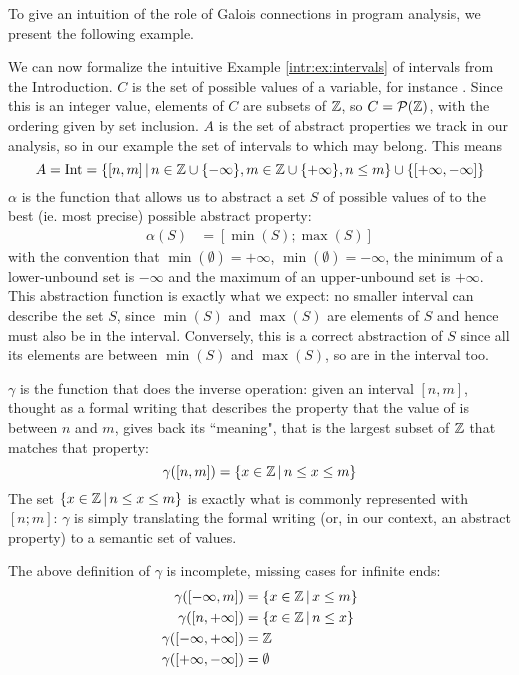 To give an intuition of the role of Galois connections in program analysis, we present the following example.
\begin{example}[Intervals]\label{ch2:ex:intervals}
	We can now formalize the intuitive Example \ref{intr:ex:intervals} of intervals from the Introduction.
	$C$ is the set of possible values of a variable, for instance . Since this is an integer value, elements of $C$ are subsets of $\mathbb{Z}$, so $C = \mathcal{P}(\mathbb{Z})$, with the ordering given by set inclusion. $A$ is the set of abstract properties we track in our analysis, so in our example the set of intervals to which  may belong. This means
	\[
	A = \text{Int} = \{ [n, m] \,\vert\, n \in \mathbb{Z} \cup \{ -\infty \}, m \in \mathbb{Z} \cup \{ +\infty \}, n \le m \} \cup \{ [+\infty, -\infty] \}
	\]
	$\alpha$ is the function that allows us to abstract a set $S$ of possible values of  to the best (ie. most precise) possible abstract property:
	\begin{align*}
		\alpha(S) &= [\min(S); \max(S)]
	\end{align*}
	with the convention that $\min(\emptyset) = +\infty$, $\min(\emptyset) = -\infty$, the minimum of a lower-unbound set is $-\infty$ and the maximum of an upper-unbound set is $+\infty$. This abstraction function is exactly what we expect: no smaller interval can describe the set $S$, since $\min(S)$ and $\max(S)$ are elements of $S$ and hence must also be in the interval. Conversely, this is a correct abstraction of $S$ since all its elements are between $\min(S)$ and $\max(S)$, so are in the interval too.

	$\gamma$ is the function that does the inverse operation: given an interval $[n, m]$, thought as a formal writing that describes the property that the value of  is between $n$ and $m$, gives back its ``meaning", that is the largest subset of $\mathbb{Z}$ that matches that property:
	\[
	\gamma([n, m]) = \{ x \in \mathbb{Z} \,\vert\, n \le x \le m \}
	\]
	The set $\{ x \in \mathbb{Z} \,\vert\, n \le x \le m \}$ is exactly what is commonly represented with $[n; m]$: $\gamma$ is simply translating the formal writing (or, in our context, an abstract property) to a semantic set of values.

	The above definition of $\gamma$ is incomplete, missing cases for infinite ends:
	\begin{align*}
		\gamma([-\infty, m]) &= \{ x \in \mathbb{Z} \,\vert\, x \le m \} \\
		\gamma([n, +\infty]) &= \{ x \in \mathbb{Z} \,\vert\, n \le x \} \\
		\gamma([-\infty, +\infty]) &= \mathbb{Z} \\
		\gamma([+\infty, -\infty]) &= \emptyset
	\end{align*}


\end{example}
